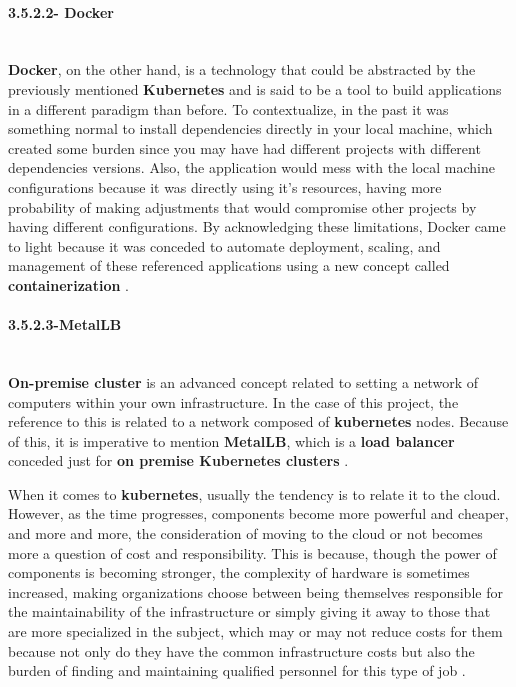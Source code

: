 \paragraph{3.5.2.2- Docker}\mbox{}\\
\textbf{Docker}, on the other hand, is a technology that could be abstracted by the previously mentioned \textbf{Kubernetes} and is 
said to be a tool to build applications in a different paradigm than before. To contextualize, in the past it was something normal to 
install dependencies directly in your local machine, which created some burden since you may have had different projects with different 
dependencies versions. Also, the application would mess with the local machine configurations because it was directly using it's resources, 
having more probability of making adjustments that would compromise other projects by having different configurations. By acknowledging these 
limitations, Docker came to light because it was conceded to automate deployment, scaling, and management of these referenced applications 
using a new concept called \textbf{containerization} \cite{docker}.

\paragraph{3.5.2.3-MetalLB}\mbox{}\\
\textbf{On-premise cluster} is an advanced concept related to setting a network of computers within your own infrastructure. In the case 
of this project, the reference to this is related to a network composed of \textbf{kubernetes} nodes. Because of this, it is imperative 
to mention \textbf{MetalLB}, which is a \textbf{load balancer} conceded just for \textbf{on premise Kubernetes clusters} \cite{lb}.

When it comes to \textbf{kubernetes}, usually the tendency is to relate it to the cloud. However, as the time progresses, components 
become more powerful and cheaper, and more and more, the consideration of moving to the cloud or not becomes more a question of cost and 
responsibility. This is because, though the power of components is becoming stronger, the complexity of hardware is sometimes increased, 
making organizations choose between being themselves responsible for the maintainability of the infrastructure or simply giving it away to 
those that are more specialized in the subject, which may or may not reduce costs for them because not only do they have the common 
infrastructure costs but also the burden of finding and maintaining qualified personnel for this type of job \cite{onpremice-cloud}.

